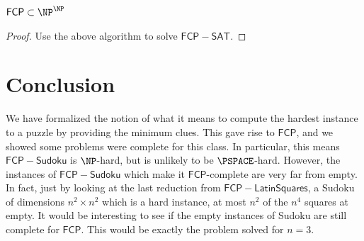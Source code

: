 \documentclass[runningheads,a4paper]{llncs}
\begin{document}
\begin{proposition}
$\mathsf{FCP} \subset \NP^\NP$
\end{proposition}

\begin{proof}
Use the above algorithm to solve $\mathsf{FCP-SAT}$. 
\end{proof}

\section{Conclusion}
\label{sec:conclusion}

We have formalized the notion of what it means to compute the hardest instance to a puzzle by providing the minimum clues. This gave rise to $\mathsf{FCP}$, and we showed some problems were complete for this class. In particular, this means $\mathsf{FCP-Sudoku}$ is $\NP$-hard, but is unlikely to be $\PSPACE$-hard. However, the instances of $\mathsf{FCP-Sudoku}$ which make it $\mathsf{FCP}$-complete are very far from empty. In fact, just by looking at the last reduction from $\mathsf{FCP-Latin Squares}$, a Sudoku of dimensions $n^2 \times n^2$ which is a hard instance, at most $n^2$ of the $n^4$ squares at empty. It would be interesting to see if the empty instances of Sudoku are still complete for $\mathsf{FCP}$. This would be exactly the problem \cite{mcguire2012there} solved for $n = 3$. 



\end{document}
